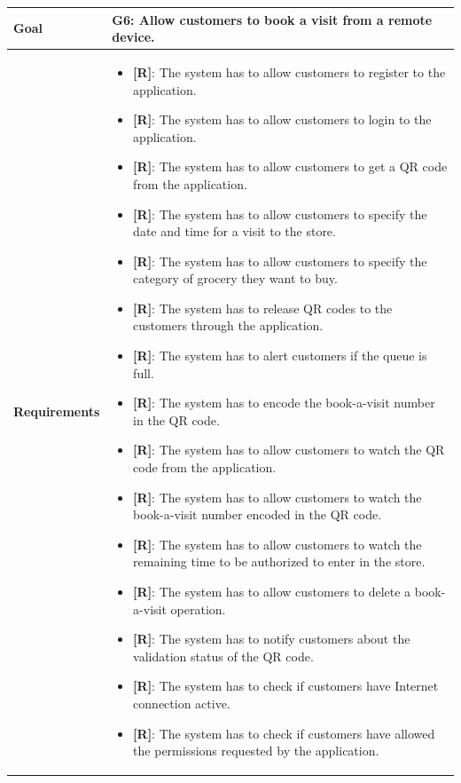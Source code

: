 \begin{table}[H]
\centering
\begin{tabular}{| m{} | m{} |} 
	\hline
	\textbf{Goal} &
		\textbf{G6: Allow customers to book a visit from a remote device.} \\
	\hline
	\textbf{Requirements} &
		\begin{itemize}
			\item {\textbf{[R]}}: The system has to allow customers to register to the application.
			\item {\textbf{[R]}}: The system has to allow customers to login to the application.
			\item {\textbf{[R]}}: The system has to allow customers to get a QR code from the application.
			\item {\textbf{[R]}}: The system has to allow customers to specify the date and time for a visit to the store.
			\item {\textbf{[R]}}: The system has to allow customers to specify the category of grocery they want to buy.
			\item {\textbf{[R]}}: The system has to release QR codes to the customers through the application.
			\item {\textbf{[R]}}: The system has to alert customers if the queue is full.
			\item {\textbf{[R]}}: The system has to encode the book-a-visit number in the QR code.
			\item {\textbf{[R]}}: The system has to allow customers to watch the QR code from the application.
			\item {\textbf{[R]}}: The system has to allow customers to watch the book-a-visit number encoded in the QR code.
			\item {\textbf{[R]}}: The system has to allow customers to watch the remaining time to be authorized to enter in the store.
			\item {\textbf{[R]}}: The system has to allow customers to delete a book-a-visit operation.
			\item {\textbf{[R]}}: The system has to notify customers about the validation status of the QR code.
			\item {\textbf{[R]}}: The system has to check if customers have Internet connection active.
			\item {\textbf{[R]}}: The system has to check if customers have allowed the permissions requested by the application.

\end{itemize}
\end{tabular}
\end{table}
